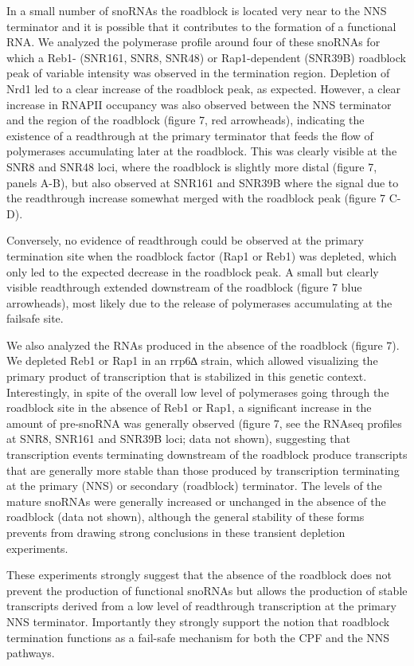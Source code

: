 In a small number of snoRNAs the roadblock is located very near to the NNS terminator and it is possible that it contributes to the formation of a functional RNA. We analyzed the polymerase profile around four of these snoRNAs for which a Reb1- (SNR161, SNR8, SNR48) or Rap1-dependent (SNR39B) roadblock peak of variable intensity was observed in the termination region. Depletion of Nrd1 led to a clear increase of the roadblock peak, as expected. However, a clear increase in RNAPII occupancy was also observed between the NNS terminator and the region of the roadblock (figure 7, red arrowheads), indicating the existence of a readthrough at the primary terminator that feeds the flow of polymerases accumulating later at the roadblock. This was clearly visible at the SNR8 and SNR48 loci, where the roadblock is slightly more distal (figure 7, panels A-B), but also observed at SNR161 and SNR39B where the signal due to the readthrough increase somewhat merged with the roadblock peak (figure 7 C-D).

Conversely, no evidence of readthrough could be observed at the primary termination site when the roadblock factor (Rap1 or Reb1) was depleted, which only led to the expected decrease in the roadblock peak.  A small but clearly visible readthrough extended downstream of the roadblock (figure 7 blue arrowheads), most likely due to the release of polymerases accumulating at the failsafe site.   

We also analyzed the RNAs produced in the absence of the roadblock (figure 7). We depleted Reb1 or Rap1 in an rrp6∆ strain, which allowed visualizing the primary product of transcription that is stabilized in this genetic context. Interestingly, in spite of the overall low level of polymerases going through the roadblock site in the absence of Reb1 or Rap1, a significant increase in the amount of pre-snoRNA was generally observed (figure 7, see the RNAseq profiles at SNR8, SNR161 and SNR39B loci; data not shown), suggesting that transcription events terminating downstream of the roadblock produce transcripts that are generally more stable than those produced by transcription terminating at the primary (NNS) or secondary (roadblock) terminator. The levels of the mature snoRNAs were generally increased or unchanged in the absence of the roadblock (data not shown), although the general stability of these forms prevents from drawing strong conclusions in these transient depletion experiments.  

These experiments strongly suggest that the absence of the roadblock does not prevent the production of functional snoRNAs but allows the production of stable transcripts derived from a low level of readthrough transcription at the primary NNS terminator. Importantly they strongly support the notion that roadblock termination functions as a fail-safe mechanism for both the CPF and the NNS pathways.


